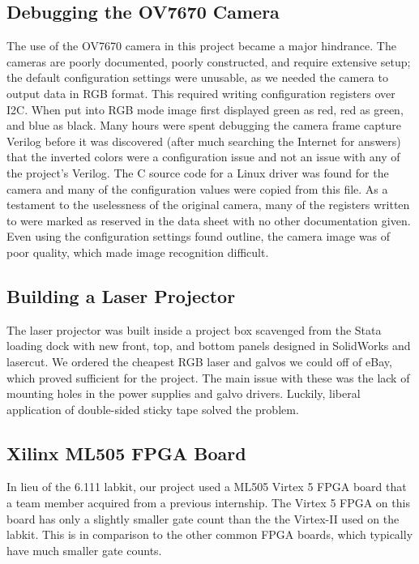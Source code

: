 \documentclass{article}
\begin{document}
\subsection{Debugging the OV7670 Camera} \label{camerasuck}

The use of the OV7670 camera in this project became a major hindrance. The cameras are poorly documented, poorly constructed, and require extensive setup; the default configuration settings were unusable, as we needed the camera to output data in RGB format. This required writing configuration registers over I2C. When put into RGB mode image first displayed green as red, red as green, and blue as black. Many hours were spent debugging the camera frame capture Verilog before it was discovered (after much searching the Internet for answers) that the inverted colors were a configuration issue and not an issue with any of the project's Verilog. The C source code for a Linux driver was found for the camera and many of the configuration values were copied from this file. As a testament to the uselessness of the original camera, many of the registers written to were marked as reserved in the data sheet with no other documentation given. Even using the configuration settings found outline, the camera image was of poor quality, which made image recognition difficult.

\subsection{Building a Laser Projector} \label{laserbox}

The laser projector was built inside a project box scavenged from the Stata loading dock with new front, top, and bottom panels designed in SolidWorks and lasercut. We ordered the cheapest RGB laser and galvos we could off of eBay, which proved sufficient for the project. The main issue with these was the lack of mounting holes in the power supplies and galvo drivers. Luckily, liberal application of double-sided sticky tape solved the problem. 

\subsection{Xilinx ML505 FPGA Board} \label{board}

In lieu of the 6.111 labkit, our project used a ML505 Virtex 5 FPGA board that a team member acquired from a previous internship. The Virtex 5 FPGA on this board has only a slightly smaller gate count than the the Virtex-II used on the labkit. This is in comparison to the other common FPGA boards, which typically have much smaller gate counts.
\end{document}
